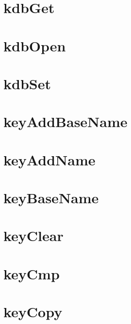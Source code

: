 \let\mypdfximage\pdfximage\def\pdfximage{\immediate\mypdfximage}\documentclass[twoside]{book}
\newcommand{\+}{\discretionary{\mbox{\scriptsize$\hookleftarrow$}}{}{}}
\begin{document}
\chapter{kdb\+Get}
\label{doc_api_review_core_kdbGet_md}

\chapter{kdb\+Open}
\label{doc_api_review_core_kdbOpen_md}

\chapter{kdb\+Set}
\label{doc_api_review_core_kdbSet_md}

\chapter{key\+Add\+Base\+Name}
\label{doc_api_review_core_keyAddBaseName_md}

\chapter{key\+Add\+Name}
\label{doc_api_review_core_keyAddName_md}

\chapter{key\+Base\+Name}
\label{doc_api_review_core_keyBaseName_md}

\chapter{key\+Clear}
\label{doc_api_review_core_keyClear_md}

\chapter{key\+Cmp}
\label{doc_api_review_core_keyCmp_md}

\chapter{key\+Copy}
\label{doc_api_review_core_keyCopy_md}

\end{document}

